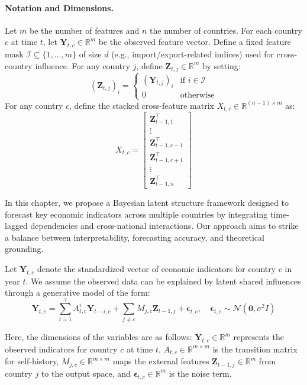 \documentclass[12pt]{article}
\begin{document}
\paragraph{Notation and Dimensions.}
Let $m$ be the number of features and $n$ the number of countries. For each country $c$ at time $t$, let $\mathbf{Y}_{t,c} \in \mathbb{R}^m$ be the observed feature vector. Define a fixed feature mask $\mathcal{I} \subseteq \{1, \ldots, m\}$ of size $d$ (e.g., import/export-related indices) used for cross-country influence. For any country $j$, define $\mathbf{Z}_{t,j} \in \mathbb{R}^m$ by setting:
\[
\left(\mathbf{Z}_{t,j}\right)_i = 
\begin{cases}
\left(\mathbf{Y}_{t,j}\right)_i & \text{if } i \in \mathcal{I} \\
0 & \text{otherwise}
\end{cases}
\]
For any country $c$, define the stacked cross-feature matrix $X_{t,c} \in \mathbb{R}^{(n-1) \times m}$ as:
\[
X_{t,c} = \begin{bmatrix}
\mathbf{Z}_{t-1,1}^\top \\
\vdots \\
\mathbf{Z}_{t-1,c-1}^\top \\
\mathbf{Z}_{t-1,c+1}^\top \\
\vdots \\
\mathbf{Z}_{t-1,n}^\top
\end{bmatrix}
\]

In this chapter, we propose a Bayesian latent structure framework designed to forecast key economic indicators across multiple countries by integrating time-lagged dependencies and cross-national interactions. Our approach aims to strike a balance between interpretability, forecasting accuracy, and theoretical grounding.

Let $\mathbf{Y}_{t,c}$ denote the standardized vector of economic indicators for country $c$ in year $t$. We assume the observed data can be explained by latent shared influences through a generative model of the form:
\[
\mathbf{Y}_{t,c} = \sum_{i=1}^\tau  A_{t,c}^i \mathbf{Y}_{t - i,c} + \sum_{j \neq c} M_{j,c} \mathbf{Z}_{t-1,j} + \boldsymbol{\epsilon}_{t,c}, \quad \boldsymbol{\epsilon}_{t,c} \sim \mathcal{N}(\mathbf{0}, \sigma^2 I)
\]

Here, the dimensions of the variables are as follows: 
$\mathbf{Y}_{t,c} \in \mathbb{R}^m$ represents the observed indicators for country $c$ at time $t$, 
$A_{t,c} \in \mathbb{R}^{m \times m}$ is the transition matrix for self-history, 
$M_{j,c} \in \mathbb{R}^{m \times m}$ maps the external features $\mathbf{Z}_{t-1,j} \in \mathbb{R}^m$ from country $j$ to the output space, 
and $\boldsymbol{\epsilon}_{t,c} \in \mathbb{R}^m$ is the noise term.
\end{document}
